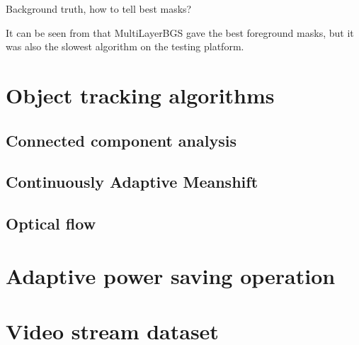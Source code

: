 {\color{red}Background truth, how to tell best masks?}

It can be seen from  that MultiLayerBGS gave the best foreground masks, but it was also the slowest algorithm on the testing platform.

\section{Object tracking algorithms}



\subsection{Connected component analysis}

\subsection{Continuously Adaptive Meanshift}

\subsection{Optical flow}

\section{Adaptive power saving operation}

\section{Video stream dataset}
